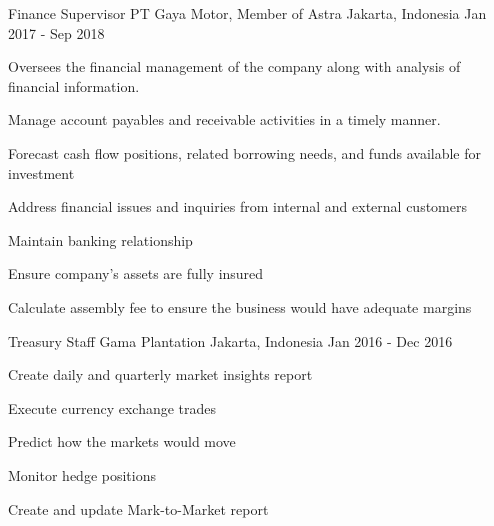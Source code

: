 \begin{cventries}
  \cventry
    {Finance Supervisor} %
    {PT Gaya Motor, Member of Astra} %
    {Jakarta, Indonesia} %
    {Jan 2017 - Sep 2018} %
    {
      \begin{cvitems} %
        \item {Oversees the financial management of the company along with analysis of financial information.}
        \item {Manage account payables and receivable activities in a timely manner.}
        \item {Forecast cash flow positions, related borrowing needs, and funds available for investment}
        \item {Address financial issues and inquiries from internal and external customers}
        \item {Maintain banking relationship}
        \item {Ensure company’s assets are fully insured}
        \item {Calculate assembly fee to ensure the business would have adequate margins}
      \end{cvitems}
    }

  \cventry
    {Treasury Staff} %
    {Gama Plantation} %
    {Jakarta, Indonesia} %
    {Jan 2016 - Dec 2016} %
    {
      \begin{cvitems} %
        \item {Create daily and quarterly market insights report}
        \item {Execute currency exchange trades}
        \item {Predict how the markets would move}
        \item {Monitor hedge positions}
        \item {Create and update Mark-to-Market report}
      \end{cvitems}
    }


\end{cventries}
